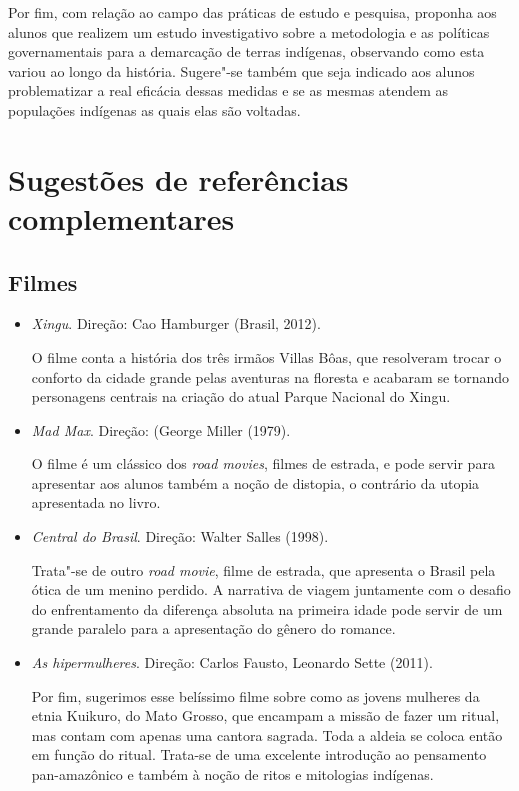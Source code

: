 \documentclass[12pt]{extarticle}
\begin{document}


Por fim, com relação ao campo das práticas de estudo e pesquisa,
proponha aos alunos que realizem um estudo investigativo sobre a
metodologia e as políticas governamentais para a demarcação de terras
indígenas, observando como esta variou ao longo da história.
Sugere"-se também que seja indicado aos alunos problematizar a real
eficácia dessas medidas e se as mesmas atendem as populações indígenas
as quais elas são voltadas.




\section{Sugestões de referências complementares}\label{sugestoes}

\subsection{Filmes}

\begin{itemize}
\item\emph{Xingu}. Direção: Cao Hamburger (Brasil, 2012).

O filme conta a história dos três irmãos Villas Bôas, que resolveram
trocar o conforto da cidade grande pelas aventuras na floresta e
acabaram se tornando personagens centrais na criação do atual Parque
Nacional do Xingu.

\item\emph{Mad Max}. Direção: (George Miller (1979).

O filme é um clássico dos \textit{road movies}, filmes de estrada, e pode servir para 
apresentar aos alunos também a noção de distopia, o contrário da utopia apresentada no livro. 

\item\emph{Central do Brasil}. Direção: Walter Salles (1998).

Trata"-se de outro \textit{road movie}, filme de estrada, que apresenta
o Brasil pela ótica de um menino perdido. A narrativa de viagem juntamente com o desafio 
do enfrentamento da diferença absoluta na primeira idade pode servir 
de um grande paralelo para a apresentação do gênero do romance. 

\item\emph{As hipermulheres}. Direção: Carlos Fausto, Leonardo Sette (2011).

Por fim, sugerimos esse belíssimo filme sobre como as jovens mulheres da etnia 
Kuikuro, do Mato Grosso, que encampam a missão de fazer um ritual, mas contam 
com apenas uma cantora sagrada. Toda a aldeia se coloca então em função do 
ritual. Trata-se de uma excelente introdução ao pensamento pan-amazônico e
também à noção de ritos e mitologias indígenas. 
\end{itemize}
\end{document}
